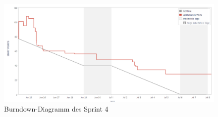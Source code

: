 \documentclass[12pt, titlepage]{scrartcl}
\begin{document}
			\begin{figure}[H] 
				\centering
				\includegraphics[width=1\textwidth]{BurndownChart_Sprint4.PNG}
				\caption{Burndown-Diagramm des Sprint 4}
				\label{BurndownSprint4}
			\end{figure}
\end{document}
